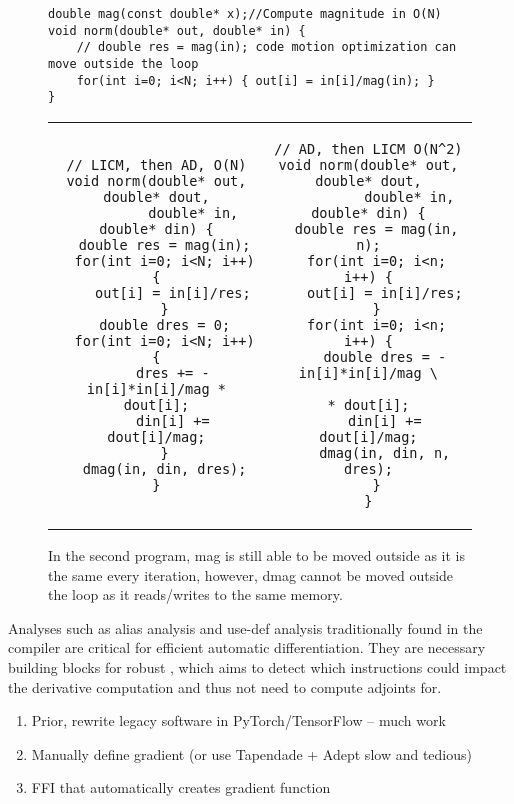 \begin{figure*}
    \centering
\begin{verbatim}
double mag(const double* x);//Compute magnitude in O(N)
void norm(double* out, double* in) {
    // double res = mag(in); code motion optimization can move outside the loop
    for(int i=0; i<N; i++) { out[i] = in[i]/mag(in); }
}
\end{verbatim}
\begin{tabular}{c|c}
\begin{minipage}[T]{0.49\linewidth}
\begin{verbatim}
// LICM, then AD, O(N)
void norm(double* out, double* dout,
         double* in, double* din) {
  double res = mag(in);
  for(int i=0; i<N; i++) {
    out[i] = in[i]/res;
  }
  double dres = 0;
  for(int i=0; i<N; i++) {
    dres += -in[i]*in[i]/mag * dout[i];
    din[i] += dout[i]/mag;
  }
  dmag(in, din, dres);
}
\end{verbatim}
\end{minipage}& \begin{minipage}[T]{0.49\linewidth}
\begin{verbatim}
// AD, then LICM O(N^2)
void norm(double* out, double* dout,
          double* in, double* din) {
  double res = mag(in, n);
  for(int i=0; i<n; i++) {
    out[i] = in[i]/res;
  }
  for(int i=0; i<n; i++) {
    double dres = -in[i]*in[i]/mag \
                        * dout[i];
    din[i] += dout[i]/mag;
    dmag(in, din, n, dres);
  }
}
\end{verbatim}
\end{minipage}
\end{tabular}
    \caption{In the second program, mag is still able to be moved outside as it is the same every iteration, however, dmag cannot be moved outside the loop as it reads/writes to the same memory.
}
    \label{fig:licm}
\end{figure*}

Analyses such as alias analysis and use-def analysis traditionally found in the compiler are critical for efficient automatic differentiation. They are necessary building blocks for robust , which aims to detect which instructions could impact the derivative computation and thus not need to compute adjoints for.





\begin{enumerate}
    \item Prior, rewrite legacy software in PyTorch/TensorFlow -- much work
    \item Manually define gradient (or use Tapendade + Adept slow and tedious)
    \item FFI that automatically creates gradient function
\end{enumerate}


